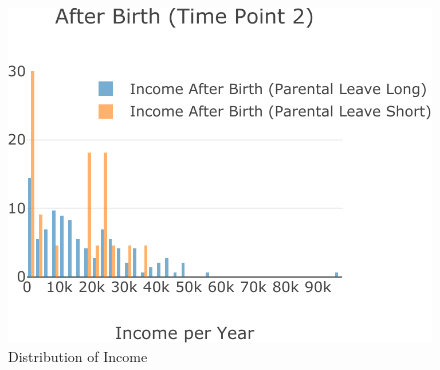 \documentclass[
  12pt,
]{article}
\begin{document}
\begin{figure}

{\centering \includegraphics{Parental_Leave-Finalizing-Data-Set_files/figure-latex/fig-4-1} 

}

\caption{Distribution of Income}\label{fig:fig-4}
\end{figure}
\end{document}
